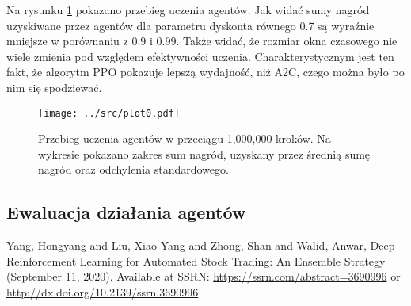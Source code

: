 \documentclass[12pt,a4paper]{article}
\begin{document}
Na rysunku \ref{fig:training} pokazano przebieg uczenia agentów.
Jak widać sumy nagród uzyskiwane przez agentów dla parametru dyskonta
równego 0.7 są wyraźnie mniejsze w porównaniu z 0.9 i 0.99. Także widać, że
rozmiar okna czasowego nie wiele zmienia pod względem efektywności uczenia.
Charakterystycznym jest ten fakt, że algorytm PPO pokazuje lepszą wydajność,
niż A2C, czego można było po nim się spodziewać.

\begin{figure}[!h]
  \centering
  \texttt{[image: ../src/plot0.pdf]}
  \caption{Przebieg uczenia agentów w przeciągu 1,000,000 kroków.
    Na wykresie pokazano zakres sum nagród, uzyskany przez
    średnią sumę nagród oraz odchylenia standardowego.}
  \label{fig:training}
\end{figure}

\subsection{Ewaluacja działania agentów}


\pagebreak
\begin{thebibliography}{9}
  Yang, Hongyang and Liu, Xiao-Yang and Zhong, Shan and Walid, Anwar,
  Deep Reinforcement Learning for Automated Stock Trading: An Ensemble
  Strategy (September 11, 2020). Available at SSRN:
  \href{https://ssrn.com/abstract=3690996}{https://ssrn.com/abstract=3690996}
  or \href{http://dx.doi.org/10.2139/ssrn.3690996}{http://dx.doi.org/10.2139/ssrn.3690996}
\end{thebibliography}
\end{document}
